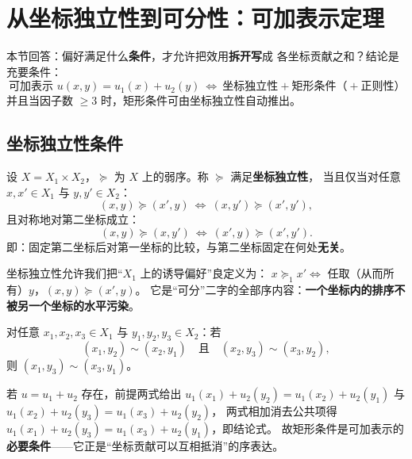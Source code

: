 \section{从坐标独立性到可分性：可加表示定理}\label{sec:separability}

本节回答：偏好满足什么\textbf{条件}，才允许把效用\textbf{拆开写}成
各坐标贡献之和？结论是充要条件：
\[
\boxed{\ \text{可加表示 }u(x,y)=u_1(x)+u_2(y)\ \Longleftrightarrow\ \text{坐标独立性}+\text{矩形条件（}+ \text{正则性）}\ }
\]
并且当因子数 $\ge 3$ 时，矩形条件可由坐标独立性自动推出。

\subsection{坐标独立性条件}

\begin{condition}[坐标独立性]\label{cond:indep}
设 $X=X_1\times X_2$，$\succeq$ 为 $X$ 上的弱序。称 $\succeq$ 满足\textbf{坐标独立性}，
当且仅当对任意 $x,x'\in X_1$ 与 $y,y'\in X_2$：
\[
(x,y)\succeq(x',y)\ \Longleftrightarrow\ (x,y')\succeq(x',y'),
\]
且对称地对第二坐标成立：
\[
(x,y)\succeq(x,y')\ \Longleftrightarrow\ (x',y)\succeq(x',y').
\]
即：固定第二坐标后对第一坐标的比较，与第二坐标固定在何处\textbf{无关}。
\end{condition}

\begin{remark}
坐标独立性允许我们把“$X_1$ 上的诱导偏好”良定义为：
$x\succeq_1 x'\iff$ 任取（从而所有）$y$，$(x,y)\succeq(x',y)$。
它是“可分”二字的全部序内容：\textbf{一个坐标内的排序不被另一个坐标的水平污染}。
\end{remark}

\begin{condition}\label{cond:thomsen}
对任意 $x_1,x_2,x_3\in X_1$ 与 $y_1,y_2,y_3\in X_2$：若
\[
(x_1,y_2)\sim(x_2,y_1)\quad\text{且}\quad (x_2,y_3)\sim(x_3,y_2),
\]
则 $(x_1,y_3)\sim(x_3,y_1)$。
\end{condition}

\begin{remark}[矩形条件的可加性含义]
若 $u=u_1+u_2$ 存在，前提两式给出
$u_1(x_1)+u_2(y_2)=u_1(x_2)+u_2(y_1)$ 与 $u_1(x_2)+u_2(y_3)=u_1(x_3)+u_2(y_2)$，
两式相加消去公共项得 $u_1(x_1)+u_2(y_3)=u_1(x_3)+u_2(y_1)$，即结论式。
故矩形条件是可加表示的\textbf{必要条件}——它正是“坐标贡献可以互相抵消”的序表达。
\end{remark}

